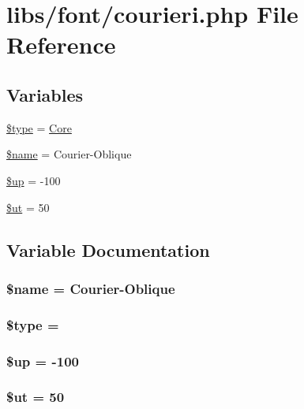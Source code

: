\hypertarget{courieri_8php}{}\section{libs/font/courieri.php File Reference}
\label{courieri_8php}
\subsection*{Variables}
\begin{DoxyCompactItemize}
\item 
\hyperlink{courieri_8php_a9a4a6fba2208984cabb3afacadf33919}{\$type} = \textquotesingle{}\hyperlink{class_core}{Core}\textquotesingle{}
\item 
\hyperlink{courieri_8php_ab2fc40d43824ea3e1ce5d86dee0d763b}{\$name} = \textquotesingle{}Courier-\/Oblique\textquotesingle{}
\item 
\hyperlink{courieri_8php_a6b5ad2ac55f9df46e8f34e78fbd6f176}{\$up} = -\/100
\item 
\hyperlink{courieri_8php_aadd3f841051043ee58e587e840e8dd0b}{\$ut} = 50
\end{DoxyCompactItemize}


\subsection{Variable Documentation}
\hypertarget{courieri_8php_ab2fc40d43824ea3e1ce5d86dee0d763b}{}
\subsubsection[{\$name}]{\setlength{\rightskip}{0pt plus 5cm}\$name = \textquotesingle{}Courier-\/Oblique\textquotesingle{}}\label{courieri_8php_ab2fc40d43824ea3e1ce5d86dee0d763b}
\hypertarget{courieri_8php_a9a4a6fba2208984cabb3afacadf33919}{}
\subsubsection[{\$type}]{\setlength{\rightskip}{0pt plus 5cm}\$type = \textquotesingle{}}\label{courieri_8php_a9a4a6fba2208984cabb3afacadf33919}
\hypertarget{courieri_8php_a6b5ad2ac55f9df46e8f34e78fbd6f176}{}
\subsubsection[{\$up}]{\setlength{\rightskip}{0pt plus 5cm}\$up = -\/100}\label{courieri_8php_a6b5ad2ac55f9df46e8f34e78fbd6f176}
\hypertarget{courieri_8php_aadd3f841051043ee58e587e840e8dd0b}{}
\subsubsection[{\$ut}]{\setlength{\rightskip}{0pt plus 5cm}\$ut = 50}\label{courieri_8php_aadd3f841051043ee58e587e840e8dd0b}
